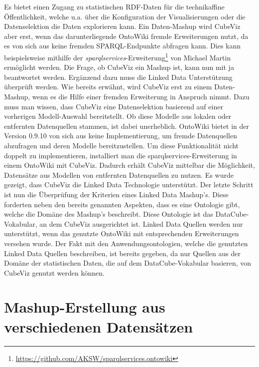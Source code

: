 \documentclass[11pt]{article}
\newcommand{\com}[1]{\marginpar{\em {\small{#1}}}} %
\begin{document}
\newpage
\noindent
Es bietet einen Zugang zu statistischen RDF-Daten für die technikaffine Öffentlichkeit, welche u.a. über die Konfiguration der Visualisierungen oder die Datenselektion die Daten explorieren kann. Ein Daten-Mashup wird CubeViz aber erst, wenn das darunterliegende OntoWiki fremde Erweiterungen nutzt, da es von sich aus keine fremden SPARQL-Endpunkte abfragen kann. Dies kann beispielsweise mithilfe der \textit{sparqlservices}-Erweiterung\footnote{\url{https://github.com/AKSW/sparqlservices.ontowiki}} von Michael Martin ermöglicht werden. Die Frage, ob CubeViz ein Mashup ist, kann nun mit ja beantwortet werden. Ergänzend dazu muss die Linked Data\com{Linked Data} Unterstützung überprüft werden. Wie bereits erwähnt, wird CubeViz erst zu einem Daten-Mashup, wenn es die Hilfe einer fremden Erweiterung in Anspruch nimmt. Dazu muss man wissen, dass \mbox{CubeViz} eine Datenselektion basierend auf einer vorherigen Modell-Auswahl bereitstellt. Ob diese Modelle aus lokalen oder entfernten Datenquellen stammen, ist dabei unerheblich. OntoWiki bietet in der Version 0.9.10 von sich aus keine Implementierung, um fremde Datenquellen abzufragen und deren Modelle bereitzustellen. Um diese Funktionalität nicht doppelt zu implementieren, installiert man die sparqlservices-Erweiterung in einem OntoWiki mit CubeViz. Dadurch erhält CubeViz mittelbar die Möglichkeit, Datensätze aus Modellen von entfernten Datenquellen zu nutzen. Es wurde gezeigt, dass CubeViz die Linked Data Technologie unterstützt. Der letzte Schritt ist nun die Überprüfung der Kriterien eines Linked Data Mashup's. \com{Linked Data Mashup} Diese forderten neben den bereits genannten Aspekten, dass es eine Ontologie gibt, welche die Domäne des Mashup's beschreibt. Diese Ontologie ist das DataCube-Vokabular, an dem CubeViz ausgerichtet ist. Linked Data Quellen werden nur unterstützt, wenn das genutzte OntoWiki mit entsprechenden Erweiterungen versehen wurde. Der Fakt mit den Anwendungsontologien, welche die genutzten Linked Data Quellen beschreiben, ist bereits gegeben, da nur Quellen aus der Domäne der statistischen Daten, die auf dem DataCube-Vokabular basieren, von CubeViz genutzt werden können.


%
%
\newpage
\section{Mashup-Erstellung aus verschiedenen Datensätzen}
\label{sec:sectionCreatingMashup}
\end{document}
